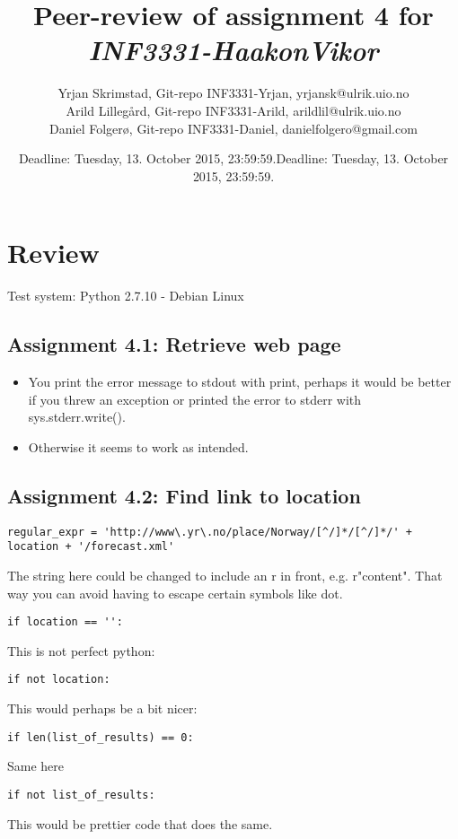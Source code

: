 \documentclass[a4paper]{article}
\title{Peer-review of assignment 4 for \textit{INF3331-HaakonVikor}}
\author{Yrjan Skrimstad, Git-repo INF3331-Yrjan, {yrjansk@ulrik.uio.no} \\
        Arild Lillegård, Git-repo INF3331-Arild, {arildlil@ulrik.uio.no} \\
        Daniel Folgerø, Git-repo INF3331-Daniel, {danielfolgero@gmail.com}}
\date{Deadline: Tuesday, 13. October 2015, 23:59:59.}
\date{Deadline: Tuesday, 13. October 2015, 23:59:59.}
\begin{document}
\maketitle

\section{Review}\label{sec:review}
Test system: Python 2.7.10 - Debian Linux

\subsection*{Assignment 4.1: Retrieve web page}
\begin{itemize}
\item You print the error message to stdout with print, perhaps it would be better if you threw an exception or printed the error to stderr with sys.stderr.write().
\item Otherwise it seems to work as intended.
\end{itemize}

\subsection*{Assignment 4.2: Find link to location}
\begin{verbatim}
regular_expr = 'http://www\.yr\.no/place/Norway/[^/]*/[^/]*/' + location + '/forecast.xml'
\end{verbatim}
The string here could be changed to include an r in front, e.g. r"content". That way you can avoid having to escape certain symbols like dot.\vspace{4mm}


\begin{verbatim}
if location == '':
\end{verbatim}
This is not perfect python:\\
\begin{verbatim}
if not location:
\end{verbatim}
This would perhaps be a bit nicer:\vspace{4mm}

\begin{verbatim}
if len(list_of_results) == 0:
\end{verbatim}
Same here\\
\begin{verbatim}
if not list_of_results:
\end{verbatim}
This would be prettier code that does the same.\\\vspace{5mm}
\end{document}
